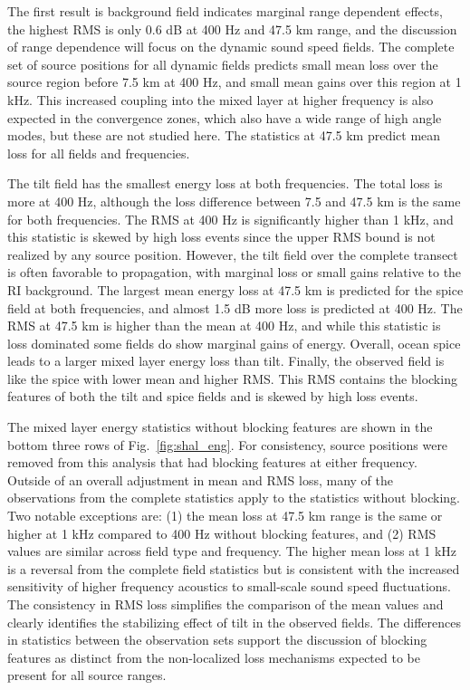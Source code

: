 \documentclass[preprint,NumberedRefs]{JASA}
\begin{document}
The first result is background field indicates marginal range dependent effects, the highest RMS is only 0.6 dB at 400 Hz and 47.5 km range, and the discussion of range dependence will focus on the dynamic sound speed fields. The complete set of source positions for all dynamic fields predicts small mean loss over the source region before 7.5 km at 400 Hz, and small mean gains over this region at 1 kHz. This increased coupling into the mixed layer at higher frequency is also expected in the convergence zones, which also have a wide range of high angle modes, but these are not studied here. The statistics at 47.5 km predict mean loss for all fields and frequencies.

The tilt field has the smallest energy loss at both frequencies. The total loss is more at 400 Hz, although the loss difference between 7.5 and 47.5 km is the same for both frequencies. The RMS at 400 Hz is significantly higher than 1 kHz, and this statistic is skewed by high loss events since the upper RMS bound is not realized by any source position. However, the tilt field over the complete transect is often favorable to propagation, with marginal loss or small gains relative to the RI background. The largest mean energy loss at 47.5 km is predicted for the spice field at both frequencies, and almost 1.5 dB more loss is predicted at 400 Hz. The RMS at 47.5 km is higher than the mean at 400 Hz, and while this statistic is loss dominated some fields do show marginal gains of energy. Overall, ocean spice leads to a larger mixed layer energy loss than tilt. Finally, the observed field is like the spice with lower mean and higher RMS. This RMS contains the blocking features of both the tilt and spice fields and is skewed by high loss events.

The mixed layer energy statistics without blocking features are shown in the bottom three rows of Fig.~\ref{fig:shal_eng}. For consistency, source positions were removed from this analysis that had blocking features at either frequency. Outside of an overall adjustment in mean and RMS loss, many of the observations from the complete statistics apply to the statistics without blocking. Two notable exceptions are: (1) the mean loss at 47.5 km range is the same or higher at 1 kHz compared to 400 Hz without blocking features, and (2) RMS values are similar across field type and frequency. The higher mean loss at 1 kHz is a reversal from the complete field statistics but is consistent with the increased sensitivity of higher frequency acoustics to small-scale sound speed fluctuations. The consistency in RMS loss simplifies the comparison of the mean values and clearly identifies the stabilizing effect of tilt in the observed fields. The differences in statistics between the observation sets support the discussion of blocking features as distinct from the non-localized loss mechanisms expected to be present for all source ranges.
\end{document}

